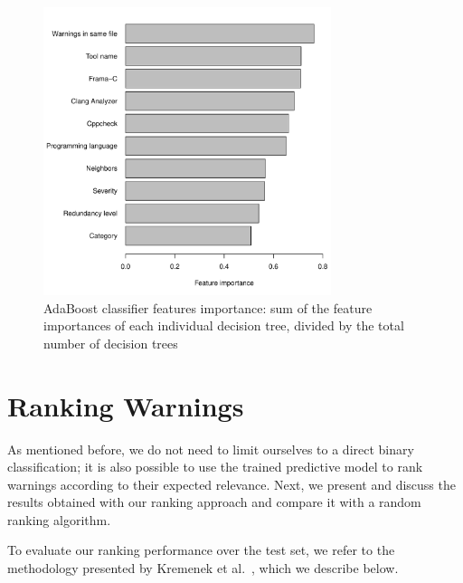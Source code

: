 \begin{figure}
\centering
\includegraphics[width=0.75\textwidth]{figures/importance.pdf}
  \caption{AdaBoost classifier features importance: sum of the feature importances of each individual decision tree, divided by the total number of decision trees}\label{fig:feature_importance}
\end{figure}

\section{Ranking Warnings}
\label{sec:results_ranking}

As mentioned before, we do not need to limit ourselves to a direct binary
classification; it is also possible to use the trained predictive model to rank
warnings according to their expected relevance. Next, we present and discuss the results obtained with
our ranking approach and compare it with a random ranking algorithm.

To evaluate our ranking
performance over the test set, we refer to the methodology presented by
Kremenek et al.~\cite{kremenek2004correlation}, which we describe below.

